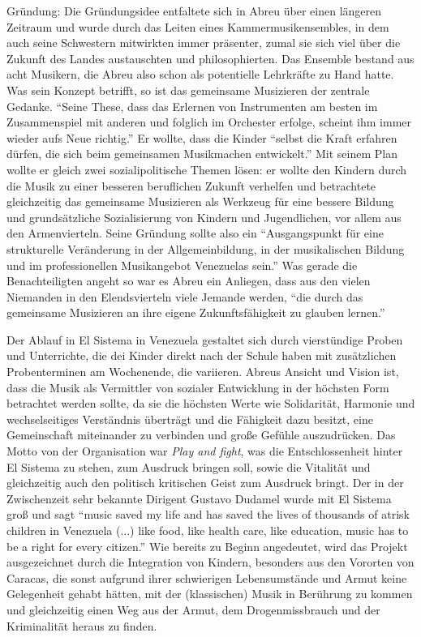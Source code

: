 Gründung: Die Gründungsidee entfaltete sich in Abreu über einen längeren
Zeitraum und wurde durch das Leiten eines Kammermusikensembles, in dem auch
seine Schwestern mitwirkten immer präsenter, zumal sie sich viel über die
Zukunft des Landes austauschten und philosophierten. Das Ensemble bestand aus
acht Musikern, die Abreu also schon als potentielle Lehrkräfte zu Hand hatte.
\autocite[34]{kaufmann:el_sistema} Was sein Konzept betrifft, so ist das
gemeinsame Musizieren der zentrale Gedanke. \enquote{Seine These, dass das
Erlernen von Instrumenten am besten im Zusammenspiel mit anderen und folglich im
Orchester erfolge, scheint ihm immer wieder aufs Neue
richtig.}\autocite[34]{kaufmann:el_sistema} Er wollte, dass die Kinder
\enquote{selbst die Kraft erfahren dürfen, die sich beim gemeinsamen Musikmachen
entwickelt.}\autocite[34]{kaufmann:el_sistema} Mit seinem Plan wollte er gleich
zwei sozialipolitische Themen lösen: er wollte den Kindern durch die Musik zu
einer besseren beruflichen Zukunft verhelfen und betrachtete gleichzeitig das
gemeinsame Musizieren als Werkzeug für eine bessere Bildung und grundsätzliche
Sozialisierung von Kindern und Jugendlichen, vor allem aus den Armenvierteln.
Seine Gründung sollte also ein \enquote{Ausgangspunkt für eine strukturelle
Veränderung in der Allgemeinbildung, in der musikalischen Bildung und im
professionellen Musikangebot Venezuelas sein.}\autocite[38]{kaufmann:el_sistema}
Was gerade die Benachteiligten angeht so war es Abreu ein Anliegen, dass aus den
vielen Niemanden in den Elendsvierteln viele Jemande werden, \enquote{die durch
das gemeinsame Musizieren an ihre eigene Zukunftsfähigkeit zu glauben
lernen.}\autocite[39]{kaufmann:el_sistema}

Der Ablauf in El Sistema in Venezuela gestaltet sich durch vierstündige Proben
und Unterrichte, die dei Kinder direkt nach der Schule haben mit zusätzlichen
Probenterminen am Wochenende, die variieren. Abreus Ansicht und Vision ist, dass
die Musik als Vermittler von sozialer Entwicklung in der höchsten Form
betrachtet werden sollte, da sie die höchsten Werte wie Solidarität, Harmonie
und wechselseitiges Verständnis überträgt und die Fähigkeit dazu besitzt, eine
Gemeinschaft miteinander zu verbinden und große Gefühle auszudrücken. Das Motto
von der Organisation war \emph{Play and fight}, was die Entschlossenheit hinter
El Sistema zu stehen, zum Ausdruck bringen soll, sowie die Vitalität und
gleichzeitig auch den politisch kritischen Geist zum Ausdruck bringt. Der in der
Zwischenzeit sehr bekannte Dirigent Gustavo Dudamel wurde mit El Sistema groß
und sagt \enquote{music saved my life and has saved the lives of thousands of
atrisk children in Venezuela (...) like food, like health care, like education,
music has to be a right for every citizen.}\autocite{wikipedia:el_sistema} Wie
bereits zu Beginn angedeutet, wird das Projekt ausgezeichnet durch die
Integration von Kindern, besonders aus den Vororten von Caracas, die sonst
aufgrund ihrer schwierigen Lebensumstände und Armut keine Gelegenheit gehabt
hätten, mit der (klassischen) Musik in Berührung zu kommen und gleichzeitig
einen Weg aus der Armut, dem Drogenmissbrauch und der Kriminalität heraus zu
finden.

